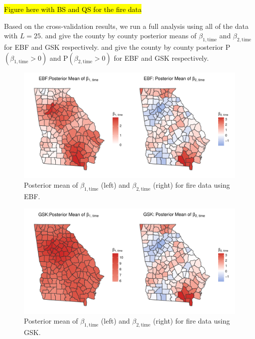 \documentclass[11pt]{article}
\begin{document}
\hl{Figure here with BS and QS for the fire data}

Based on the cross-validation results, we run a full analysis using all of the data with $L = 25$.
 and  give the county by county posterior means of $\beta_{1, \text{time}}$ and $\beta_{2, \text{time}}$ for EBF and GSK respectively.
 and  give the county by county posterior P$(\beta_{1, \text{time}} > 0)$ and P$(\beta_{2, \text{time}} > 0)$ for EBF and GSK respectively.

\begin{figure}[htbp]  %
  \centering
  \includegraphics[width=\linewidth]{plots/fire-ebf-post-betatime.pdf}
  \caption{Posterior mean of $\beta_{1, \text{time}}$ (left) and $\beta_{2, \text{time}}$ (right) for fire data using EBF.}
  \label{ebfig:fire-ebfpostbeta1}
\end{figure}

\begin{figure}[htbp]  %
  \centering
  \includegraphics[width=\linewidth]{plots/fire-gsk-post-betatime.pdf}
  \caption{Posterior mean of $\beta_{1, \text{time}}$ (left) and $\beta_{2, \text{time}}$ (right) for fire data using GSK.}
  \label{ebfig:fire-gskpostbeta1}
\end{figure}
\end{document}
